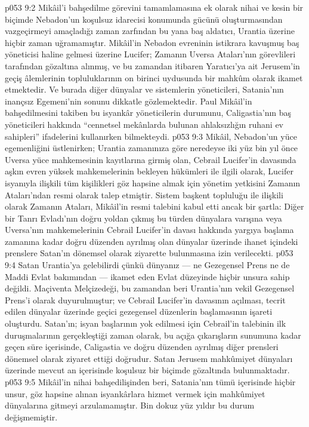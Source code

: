 \vs p053 9:2 Mikâil’i bahşedilme görevini tamamlamasına ek olarak nihai ve kesin bir biçimde Nebadon’un koşulsuz idarecisi konumunda gücünü oluşturmasından vazgeçirmeyi amaçladığı zaman zarfından bu yana baş aldatıcı, Urantia üzerine hiçbir zaman uğramamıştır. Mikâil’in Nebadon evreninin istikrara kavuşmuş baş yöneticisi haline gelmesi üzerine Lucifer; Zamanın Uversa Ataları’nın görevlileri tarafından gözaltına alınmış, ve bu zamandan itibaren Yaratıcı’ya ait Jerusem’in geçiş âlemlerinin topluluklarının on birinci uydusunda bir mahkûm olarak ikamet etmektedir. Ve burada diğer dünyalar ve sistemlerin yöneticileri, Satania’nın inançsız Egemeni’nin sonunu dikkatle gözlemektedir. Paul Mikâil’in bahşedilmesini takiben bu isyankâr yöneticilerin durumunu, Caligastia’nın baş yöneticileri hakkında “cennetsel mekânlarda bulunan ahlaksızlığın ruhani ev sahipleri” ifadelerini kullanırken bilmekteydi.
\vs p053 9:3 Mikâil, Nebadon’un yüce egemenliğini üstlenirken; Urantia zamanınıza göre neredeyse iki yüz bin yıl önce Uversa yüce mahkemesinin kayıtlarına girmiş olan, Cebrail  Lucifer’in davasında aşkın evren yüksek mahkemelerinin bekleyen hükümleri ile ilgili olarak, Lucifer isyanıyla ilişkili tüm kişilikleri göz hapsine almak için yönetim yetkisini Zamanın Ataları’ndan resmi olarak talep etmiştir. Sistem başkent topluluğu ile ilişkili olarak Zamanın Ataları, Mikâil’in resmi talebini kabul etti ancak bir şartla: Diğer bir Tanrı Evladı’nın doğru yoldan çıkmış bu türden dünyalara varışına veya Uversa’nın mahkemelerinin Cebrail  Lucifer’in davası hakkında yargıya başlama zamanına kadar doğru düzenden ayrılmış olan dünyalar üzerinde ihanet içindeki prenslere Satan’ın dönemsel olarak ziyarette bulunmasına izin verilecekti.
\vs p053 9:4 Satan Urantia’ya gelebilirdi çünkü dünyanız --- ne Gezegensel Prens ne de Maddi Evlat bakımından --- ikamet eden Evlat düzeyinde hiçbir unsura sahip değildi. Maçiventa Melçizedeği, bu zamandan beri Urantia’nın vekil Gezegensel Prens’i olarak duyurulmuştur; ve Cebrail  Lucifer’in davasının açılması, tecrit edilen dünyalar üzerinde geçici gezegensel düzenlerin başlamasının işareti oluşturdu. Satan’ın; isyan başlarının yok edilmesi için Cebrail’in talebinin ilk duruşmalarının gerçekleştiği zaman olarak, bu açığa çıkarışların sunumuna kadar geçen süre içerisinde, Caligastia ve doğru düzenden ayrılmış diğer prensleri dönemsel olarak ziyaret ettiği doğrudur. Satan Jerusem mahkûmiyet dünyaları üzerinde mevcut an içerisinde koşulsuz bir biçimde gözaltında bulunmaktadır.
\vs p053 9:5 Mikâil’in nihai bahşedilişinden beri, Satania’nın tümü içerisinde hiçbir unsur, göz hapsine alınan isyankârlara hizmet vermek için mahkûmiyet dünyalarına gitmeyi arzulamamıştır. Bin dokuz yüz yıldır bu durum değişmemiştir.
